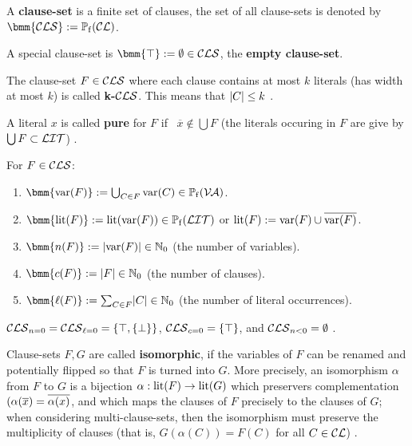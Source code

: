 \documentclass[]{book}
\begin{document}
\begin{defi}\label{def:cls}
      A \textbf{clause-set} is a finite set of clauses, the set of all clause-sets is denoted by $\bmm{\Cls} := \pote(\Cl)$.

      A special clause-set is $\bmm{\top} := \es \in \Cls$, the \textbf{empty clause-set}.
\end{defi}
\begin{defi}\label{def:cls2}
      The clause-set $F \in \mathcal{CLS}$ where each clause contains at most $k$ literals (has width at most $k$) is called \textbf{k-}$\mathcal{CLS}$.
      This means that $\lvert C \rvert \le k$ \cite{h5}.
\end{defi}
\begin{defi}\label{def:cls3}
      A literal $x$ is called \textbf{pure} for $F$ if \ $\overline{x} \not \in \bigcup F$ 
      (the literals occuring in $F$ are give by $\bigcup F \subset \mathcal{LIT}$) \cite{h5}.
\end{defi}
\begin{defi}\label{def:cls4}
      For $F \in \mathcal{CLS}$:
      \begin{enumerate}
            \item $\bmm{\var(F)} := \bc_{C \in F} \var(C) \in \pote(\Va)$.
            \item $\bmm{\lit(F)} := \lit(\var(F)) \in \pote(\Lit)$ or $\operatorname{lit}(F) := \operatorname{var}(F) \cup \overline{\operatorname{var}(F)}$.
            \item $\bmm{n(F)} := \abs{\var(F)} \in \NNZ$ (the number of variables).
            \item $\bmm{c(F)} := \abs{F} \in \NNZ$ (the number of clauses).
            \item $\bmm{\ell(F)} := \sum_{C \in F} \abs{C} \in \NNZ$ (the number of literal occurrences).
      \end{enumerate}
\end{defi}
\begin{examp}\label{exp:classescls}
  $\mathcal{CLS}_{n=0} = \mathcal{CLS}_{\ell=0} = \{ \top, \{ \bot \} \}$, $\mathcal{CLS}_{c=0} = \{ \top \}$, and $\mathcal{CLS}_{n<0} = \emptyset$ \cite{h9}.
\end{examp}
\begin{defi}\label{def:cls6}
      Clause-sets $F,G$ are called \textbf{isomorphic}, if the variables of $F$ can be renamed and potentially flipped so that $F$ is 
	  turned into $G$. More precisely, an isomorphism $\alpha$ from $F$ to $G$ is a bijection $\alpha : \operatorname{lit}(F) \rightarrow \operatorname{lit}(G)$ 
	  which preservers complementation $(\alpha(\overline x) = \overline {\alpha(x)}$, and which maps the clauses of $F$ precisely to the 
	  clauses of $G$; when considering multi-clause-sets, then the isomorphism must preserve the multiplicity of clauses (that is, 
	  $G(\alpha(C)) = F(C)$ for all $C \in \mathcal{CL}$) \cite{h9}.
\end{defi}
\end{document}
